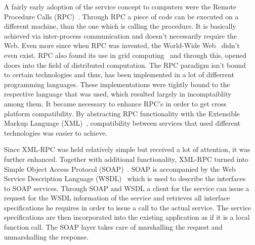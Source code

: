 A fairly early adoption of the service concept to computers were the Remote Procedure Calls (\textrm{RPC})~\cite{Birrell:1984:IRP:2080.357392}.
Through \textrm{RPC} a piece of code can be executed on a different machine, than the one which is calling the procedure.
It is basically achieved via inter-process communication and doesn't necessarily require the Web.
Even more since when \textrm{RPC} was invented, the \textrm{World-Wide Web}~\cite{DBLP:journals/en/Berners-LeeCGP92} didn't even exist. 
\textrm{RPC} also found its use in grid computing~\cite{seymour2002overview} and through this, opened doors into the field of distributed computation.
The \textrm{RPC} paradigm isn't bound to certain technologies and thus, has been implemented in a lot of differrent programming languages.
These implementations were tightly bound to the respective language that was used, which resulted largely in incomptaiblity among them.
It became necessary to enhance \textrm{RPC}'s in order to get cross platform compatibility.
By abstracting \textrm{RPC} functionality with the Extensible Markup Language (\textrm{XML})~\cite{bray1998extensible}, compatibility between services that used different technologies was easier to achieve.

Since \textrm{XML-RPC} was held relatively simple but received a lot of attention, it was further enhanced.
Together with additional functionality, XML-RPC turned into Simple Object Access Protocol (\textrm{SOAP})~\cite{box2000simple}.
\textrm{SOAP} is accompanied by the Web Service Description Language (\textrm{WSDL})~\cite{christensen2001web} which is used to describe the interfaces to SOAP services.
Through \textrm{SOAP} and \textrm{WSDL} a client for the service can issue a request for the \textrm{WSDL} information of the service and retrieves all interface specifications he requires in order to issue a call to the actual service.
The service specifications are then incorporated into the existing application as if it is a local function call.
The \textrm{SOAP} layer takes care of marshalling the request and unmarshalling the response.

